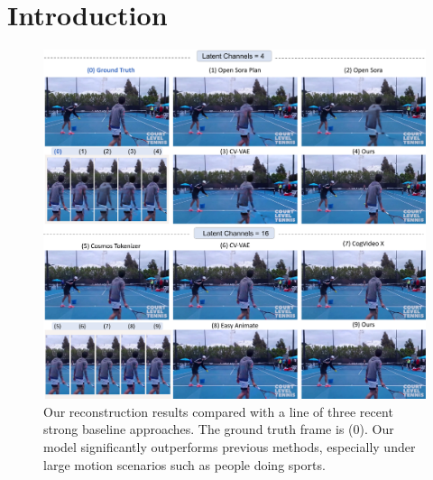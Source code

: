\section{Introduction}
\label{sec:intro}

\begin{figure}[t]
\centering
\includegraphics[width=1.0\textwidth]{images/fig1-4and16.pdf}
\caption{
Our reconstruction results compared with a line of three recent strong baseline approaches. 
The ground truth frame is (0). Our model significantly outperforms previous methods, especially under large motion scenarios such as people doing sports.
}
\label{fig:teaser}
\vspace{-3mm}
\end{figure}



